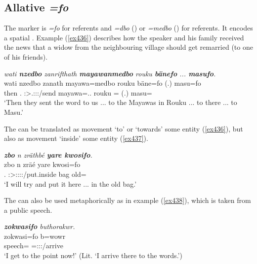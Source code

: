 \subsection{Allative \emph{=fo}} \label{allativecase}

The   marker is \emph{=fo} for  referents and \emph{=dbo} (\Sg) or \emph{=medbo} (\Nsg) for  referents. It encodes a spatial . Example (\ref{ex436}) describes how the speaker and his family received the news that a widow from the neighbouring village should get remarried (to one of his friends). 

\begin{exe}
	\ex \emph{wati \textbf{nzedbo} zanrifthath \textbf{mayawanmedbo} rouku \textbf{bänefo} ... \textbf{masufo}.}\\
	\gll wati nzedbo zanath mayawa=medbo rouku bäne=fo (.) masu=fo\\
	then \Fnsg.\All{} \Stpl:\Sbj>\Tsg.\F:\Obj:\Pst:\Pfv/send mayawa=\All.\Anim.\Nsg{} rouku \Recog=\All{} (.) masu=\All{}\\
	\trans `Then they sent the word to us ... to the Mayawas in Rouku ... to there ... to Masu.'
	\label{ex436}
\end{exe}
	 
The  can be translated as movement `to' or `towards' some entity (\ref{ex436}), but also as movement `inside' some entity (\ref{ex437}).

\begin{exe}
	\ex \emph{\textbf{zbo} n zräthbé \textbf{yare kwosifo}.}\\
	\gll zbo n zräé yare kwosi=fo\\
	\Prox.\All{} \Imn{} \Fsg:\Sbj>\Tsg:\F:\Obj:\Irr:\Pfv/put.inside bag old=\All{}\\
	\trans `I will try and put it here ... in the old bag.'
	\label{ex437}
\end{exe}

The  can also be used metaphorically as in example (\ref{ex438}), which is taken from a public speech.
	
\begin{exe}
	\ex \emph{\textbf{zokwasifo} buthorakwr.}\\
	\gll zokwasi=fo b=wowr\\
	speech=\All{} \Med=\Fsg:\Sbj:\Nonpast:\Ipfv/arrive\\
	\trans `I get to the point now!' (Lit. `I arrive there to the words.')\\
	\label{ex438}
\end{exe}

